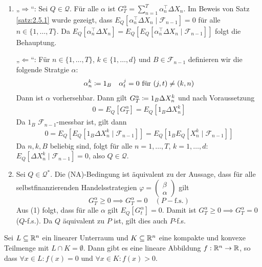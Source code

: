 \documentclass[a4paper,twoside,DIV15,BCOR12mm]{scrbook}
\newcommand{\cF}{\mathcal F}
\newcommand{\cQ}{\mathcal Q}
\begin{document}
\begin{beweis}
\begin{enumerate}
\item „$\Longrightarrow$“: Sei $Q\in\cQ$. Für alle $\alpha$ ist $G_T^\alpha = \sum_{n=1}^T \alpha_n^\top \Delta X_n$. Im Beweis von Satz \ref{satz:2.5.1} wurde gezeigt, dass $E_Q[\alpha_n^\top \Delta X_n\mid \cF_{n-1}]=0$ für alle $n\in\{1,\ldots,T\}$. Da $E_Q[\alpha_n^\top \Delta X_n] = E_Q[E_Q[\alpha_n^\top \Delta X_n \mid \cF_{n-1}]]$ folgt die Behauptung.

„$\Longleftarrow$“: Für $n\in\{1,\ldots,T\}$, $k\in\{1,\ldots,d\}$ und $B\in\cF_{n-1}$ definieren wir die folgende Stratgie $\alpha$:
\begin{align*}
\alpha_n^k\da 1_B && \alpha_t^j = 0 \text{ für } (j,t) \ne (k,n)
\end{align*}
Dann ist $\alpha$ vorhersehbar. Dann gilt $G_T^\alpha \da 1_B\Delta X_n^k$ und nach Voraussetzung
\begin{align*}
0 = E_Q[G_T^\alpha] = E_Q[1_B \Delta X_n^k]
\end{align*}
Da $1_B$ $\cF_{n-1}$-messbar ist, gilt dann 
\begin{align*}
0 = E_Q[E_Q[1_B \Delta X_n^k\mid \cF_{n-1}]] = E_Q[1_B E_Q[X_n^k\mid \cF_{n-1}]]
\end{align*}
Da $n,k,B$ beliebig sind, folgt für alle $n=1,\ldots,T$, $k=1,\ldots,d$: $E_Q[\Delta X_n^k\mid \cF_{n-1}]=0$, also $Q\in \cQ$.
\item Sei $Q\in \cQ^*$. Die (NA)-Bedingung ist äquivalent zu der Aussage, dass für alle selbstfinanzierenden Handelsstrategien
$\varphi=\left(\begin{smallmatrix} \beta \\ \alpha \end{smallmatrix}\right)$ 
gilt
\[
G_T^\alpha \ge 0 \implies G_T^\alpha = 0 \quad (P-\text{f.s.})
\]
Aus (1) folgt, dass für alle $\alpha$ gilt $E_Q[G^\alpha_t] = 0$. Damit ist $G_T^\alpha \ge 0 \implies G_T^\alpha = 0$ ($Q$-f.s.). Da $Q$ äquivalent zu $P$ ist, gilt dies auch $P$-f.s.
\end{enumerate}
\end{beweis}


\begin{lemma}[Trennungssatz]
Sei $L\subseteq \mathbb{R}^n$ ein linearer Unterraum und $K\subseteq \mathbb{R}^n$ eine kompakte und konvexe Teilmenge mit $L\cap K=\emptyset$. Dann gibt es eine lineare Abbildung $f:\mathbb{R}^n \to \mathbb{R}$, so dass $\forall x\in L: f(x) = 0$ und $\forall x\in K: f(x) >0$.
\label{lem:2.5.3}
\end{lemma}
\end{document}
